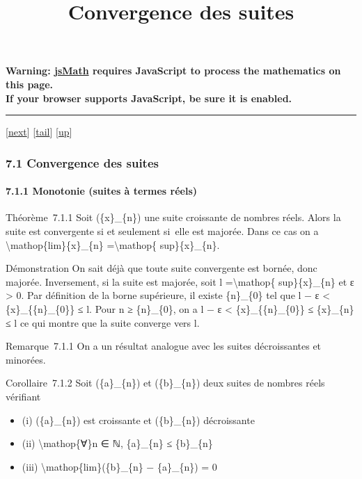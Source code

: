 \documentclass[]{article}
\title{Convergence des suites}
\author{}
\date{}
\begin{document}
\maketitle

\textbf{Warning: \href{http://www.math.union.edu/locate/jsMath}{jsMath}
requires JavaScript to process the mathematics on this page.\\ If your
browser supports JavaScript, be sure it is enabled.}

\begin{center}\rule{3in}{0.4pt}\end{center}

{[}\href{coursse36.html}{next}{]}
{[}\hyperref[tailcoursse35.html]{tail}{]}
{[}\href{coursch8.html\#coursse35.html}{up}{]}

\subsubsection{7.1 Convergence des suites}

\paragraph{7.1.1 Monotonie (suites à termes réels)}

Théorème~7.1.1 Soit (\{x\}\_\{n\}) une suite croissante de nombres
réels. Alors la suite est convergente si et seulement si~elle est
majorée. Dans ce cas on a \textbackslash{}mathop\{lim\}\{x\}\_\{n\}
=\textbackslash{}mathop\{ sup\}\{x\}\_\{n\}.

Démonstration On sait déjà que toute suite convergente est bornée, donc
majorée. Inversement, si la suite est majorée, soit l
=\textbackslash{}mathop\{ sup\}\{x\}\_\{n\} et ε \textgreater{} 0. Par
définition de la borne supérieure, il existe \{n\}\_\{0\} tel que l − ε
\textless{} \{x\}\_\{\{n\}\_\{0\}\} ≤ l. Pour n ≥ \{n\}\_\{0\}, on a l −
ε \textless{} \{x\}\_\{\{n\}\_\{0\}\} ≤ \{x\}\_\{n\} ≤ l ce qui montre
que la suite converge vers l.

Remarque~7.1.1 On a un résultat analogue avec les suites décroissantes
et minorées.

Corollaire~7.1.2 Soit (\{a\}\_\{n\}) et (\{b\}\_\{n\}) deux suites de
nombres réels vérifiant

\begin{itemize}
\itemsep1pt\parskip0pt
\item
  (i) (\{a\}\_\{n\}) est croissante et (\{b\}\_\{n\}) décroissante
\item
  (ii) \textbackslash{}mathop\{∀\}n ∈ ℕ, \{a\}\_\{n\} ≤ \{b\}\_\{n\}
\item
  (iii) \textbackslash{}mathop\{lim\}(\{b\}\_\{n\} − \{a\}\_\{n\}) = 0
\end{itemize}
\end{document}
